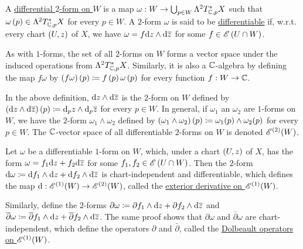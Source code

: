 \documentclass[../Moduli_Spaces_of_Riemann_Surfaces.tex]{subfiles}
\begin{document}
    \begin{definition}
        A \ul{differential $2$-form on $W$} is a map $\omega:W\to\bigcup_{p\in W}\Lambda^2T_{\mathbb{C},p}^\ast X$ such that $\omega\left(p\right)\in\Lambda^2T_{\mathbb{C},p}^\ast X$ for every $p\in W$. A $2$-form $\omega$ is said to be \ul{differentiable} if, w.r.t. every chart $\left(U,z\right)$ of $X$, we have $\omega=f\mathrm{d} z\wedge\mathrm{d}\overline{z}$ for some $f\in\mathscr{E}\left(U\cap W\right)$.
    \end{definition}
    \begin{remark}
        As with $1$-forms, the set of all $2$-forms on $W$ forms a vector space under the induced operations from $\Lambda^2T_{\mathbb{C},p}^\ast X$. Similarly, it is also a $\mathbb{C}$-algebra by defining the map $f\omega$ by $\left(f\omega\right)\left(p\right)\coloneqq f\left(p\right)\omega\left(p\right)$ for every function $f:W\to \mathbb{C}$.\exqed
    \end{remark}
    \begin{remark}
        In the above definition, $\mathrm{d} z\wedge\mathrm{d}\overline{z}$ is the $2$-form on $W$ defined by $\left(\mathrm{d} z\wedge\mathrm{d}\overline{z}\right)\left(p\right)\coloneqq\mathrm{d}_pz\wedge\mathrm{d}_p\overline{z}$ for every $p\in W$. In general, if $\omega_1$ an $\omega_2$ are $1$-forms on $W$, we have the $2$-form $\omega_1\wedge\omega_2$ defined by $\left(\omega_1\wedge\omega_2\right)\left(p\right)\coloneqq\omega_1\!\left(p\right)\wedge\omega_2\!\left(p\right)$ for every $p\in W$. The $\mathbb{C}$-vector space of all differentiable $2$-forms on $W$ is denoted $\mathscr{E}^{\left(2\right)}\!\left(W\right)$.\exqed
    \end{remark}
    \begin{defprop}
        Let $\omega$ be a differentiable $1$-form on $W$, which, under a chart $\left(U,z\right)$ of $X$, has the form $\omega=f_1\mathrm{d} z+f_2\mathrm{d}\overline{z}$ for some $f_1,f_2\in\mathscr{E}\left(U\cap W\right)$. Then the $2$-form $\mathrm{d}\omega\coloneqq\mathrm{d} f_1\wedge\mathrm{d} z+\mathrm{d} f_2\wedge\mathrm{d}\overline{z}$ is chart-independent and differentiable, which defines the map $\mathrm{d}:\mathscr{E}^{\left(1\right)}\!\left(W\right)\to\mathscr{E}^{\left(2\right)}\!\left(W\right)$, called the \ul{exterior derivative on $\mathscr{E}^{\left(1\right)}\!\left(W\right)$}.
    \end{defprop}
    \begin{remark}
        Similarly, define the $2$-forms $\partial\omega\coloneqq\partial f_1\wedge\mathrm{d} z+\partial f_2\wedge\mathrm{d}\overline{z}$ and $\overline{\partial}\omega\coloneqq\overline{\partial}f_1\wedge\mathrm{d} z+\overline{\partial}f_2\wedge\mathrm{d}\overline{z}$. The same proof shows that $\partial\omega$ and $\bar{\partial}\omega$ are chart-independent, which define the operators $\partial$ and $\bar{\partial}$, called the \ul{Dolbeault operators on $\mathscr{E}^{\left(1\right)}\!\left(W\right)$}.\exqed
    \end{remark}
\end{document}
